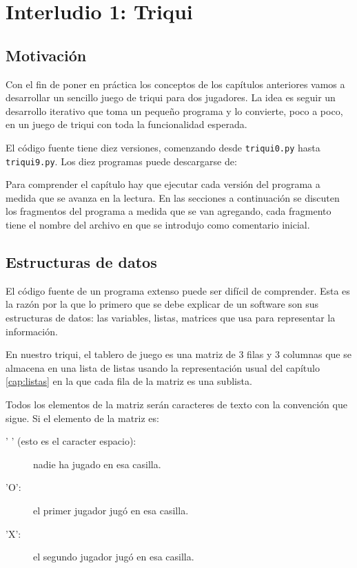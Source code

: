 
\chapter{Interludio 1: Triqui }

\label{cap:inter1:triqui} 

\section{Motivación}

Con el fin de poner en práctica los conceptos de los capítulos anteriores
vamos a desarrollar un sencillo juego de triqui para dos jugadores.
La idea es seguir un desarrollo iterativo que toma un pequeño programa
y lo convierte, poco a poco, en un juego de triqui con toda la funcionalidad
esperada.

El código fuente tiene diez versiones, comenzando desde \texttt{triqui0.py}
hasta \texttt{triqui9.py}. Los diez programas puede descargarse de:

\url{}

Para comprender el capítulo hay que ejecutar cada versión del programa
a medida que se avanza en la lectura. En las secciones a continuación
se discuten los fragmentos del programa a medida que se van agregando,
cada fragmento tiene el nombre del archivo en que se introdujo como
comentario inicial.

\section{Estructuras de datos}

El código fuente de un programa extenso puede ser difícil de comprender.
Esta es la razón por la que lo primero que se debe explicar de un
software son sus estructuras de datos: las variables, listas, matrices
que usa para representar la información.

En nuestro triqui, el tablero de juego es una matriz de 3 filas y
3 columnas que se almacena en una lista de listas usando la representación
usual del capítulo \ref{cap:listas} en la que cada fila de la matriz
es una sublista.

Todos los elementos de la matriz serán caracteres de texto con la
convención que sigue. Si el elemento de la matriz es:
\begin{description}
\item [{' ' (esto es el caracter espacio):}] nadie ha jugado en esa casilla. 
\item [{'O': }] el primer jugador jugó en esa casilla. 
\item [{'X':}] el segundo jugador jugó en esa casilla. 
\end{description}

